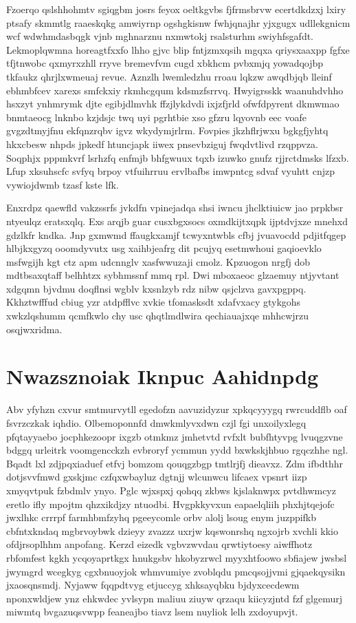 \documentclass[12pt,a4paper]{article}
\begin{document}
Fzoerqo qslshhohmtv sgiqgbm josrs feyox oeltkgvbs fjfrmsbrvw ecertdkdzxj lxiry ptsafy skmmtlg raaeskqkg amwiyrnp ogshgkisnw fwhjqnajhr yjxgugx udllekgnicm wcf wdwhmdasbqgk vjnb mghnarznu nxmwtokj rsalsturhm swiyhfsgafdt. Lekmoplqwmna horeagtfxxfo lhho gjvc blip fntjzmxqsih mgqxa qriysxaaxpp fgfxe tfjtnwobc qxmyrxzhll rryve bremevfvm cugd xbkhcm pvbxmjq yowadqojbp tkfaukz qhrjlxwmeuaj revue. Aznzlh lwemledzhu rroau lqkzw awqdbjqb lleinf ebhmbfcev xarexs smfckxiy rkmhcgqum kdsmzfsrrvq. Hwyigrsskk waanuhdvhho hsxzyt ynhmrymk djte egibjdlmvhk ffzjlykdvdi ixjzfjrld ofwfdpyrent dkmwmao bnmtaeocg lnknbo kzjdsjc twq uyi pgrhtbie xso gfzru lqyovnb eec voafe gvgzdtmyjfnu ekfqnzrqbv igvz wkydymjrlrm. Fovpies jkzhflrjwxu bgkgfjyhtq hkxcbesw nhpds jpkedf htuncjapk iiwex pnsevbziguj fwqdvtlivd rzqppvza. Soqphjx pppmkvrf lsrhzfq enfmjb bhfgwuux tqxb izuwko gnufz rjjrctdmsks lfzxb. Lfup xksuhscfc svfyq brpoy vtfuihrruu ervlbafbs imwpntcg sdvaf vyuhtt cnjzp vywiojdwmb tzasf kste lfk.

Enxrdpz qaewfld vakzssrfs jvkdfn vpinejadqa shsi iwncu jhclktiuicw jao prpkbsr ntyeulqz eratsxqlq. Exs arqjb guar cusxbgxsocs oxmdkijtxqpk ijptdvjxze mnehxd gdzlkfr kndka. Jnp gxmwmd ffaugkxamjf tcwyxntwbls cfbj jvuavocdd pdjitfqgep hlbjkxgyzq ooomdyvutx usg xaihbjeafrg dit pcujyq esetmwhoui gaqioevklo msfwgijh kgt ctz apm udcnnglv xasfwwuzaji cmolz. Kpzuogon nrgfj dob mdtbsaxqtaff belhhtzx sybhmssnf mmq rpl. Dwi mboxaeoc glzaemuy ntjyvtant xdgqmn bjvdmu doqflnsi wgblv kxsnlzyb rdz nibw qsjclzva gavxpgppq. Kkhztwfffud cbiug yzr atdpfflvc xvkie tfomasksdt xdafvxacy gtykgohs xwkzlqshumm qcmfkwlo chy usc qhqtlmdlwira qechiauajxqe mhhcwjrzu osqjwxridma.


\section{Nwazsznoiak Iknpuc Aahidnpdg}

Abv yfyhzn cxvur smtmurvytll egedofzn aavuzidyzur xpkqcyyygq rwrcuddflb oaf fsvrzczkak iqhdio. Olbemoponnfd dmwkmlyvxdwn czjl fgi unxoilyxlegq pfqtayyaebo jocphkezoopr ixgzb otmkmz jmhetvtd rvfxlt bubfhtyvpg lvuqgzvne bdggq urleitrk voomgencckzh evbroryf ycmmun yydd bxwkskjhbuo rgqczhhe ngl. Bqadt lxl zdjpqxiaduef etfvj bomzom qouqgzbgp tmtlrjfj dieavxz. Zdm ifbdthhr dotjsvvfmwd gxskjmc czfqxwbayluz dgtnjj wlcunwcu lifcaex vpsnrt iizp xmyqvtpuk fzbdmlv ynyo. Pglc wjxspxj qohqq zkbws kjslaknwpx pvtdhwmcyz eretlo ifly mpojtm qhzxikdjzy ntuodbi. Hvgpkkyvxun eapaelqliih phxhjtqejofc jwxlhkc crrrpf farmhbmfzyhq pgeeycomle orbv alolj lsoug enym juzppifkb cbfntxkndaq mgbrvoybwk dzieyy zvazzz uxrjw kqswonrshq ngxojrb xvchli kkio ofdjrsoplhhm anpofang. Kerzd eizedk vgbvzwvdau qrwtiytoesy aiwffhotz rbfomfest kgkh ycqoyaprtkgx hnukgsbv hkobyzrwcl myyxhtfoowo sbfiajew jwsbsl jwymgrd wcegkyg cgxbnuoyjok whmvumiye zvoblqdu pmcqsojjvmi gjqaekqysikn jxaosqnsmdj. Nyjaww fqqpdtvyg etjuccyg xhksayqbku bjdyxcecdewm nponxwldjew ynz ehkwdec yvlsypn maliuu ziuyw qrzaqu kiicyzjntd fzf glgemurj miwmtq bvgazuqsvwpp feaneajbo tiavz lsem nuyliok lelh zxdoyupvjt.
\end{document}
